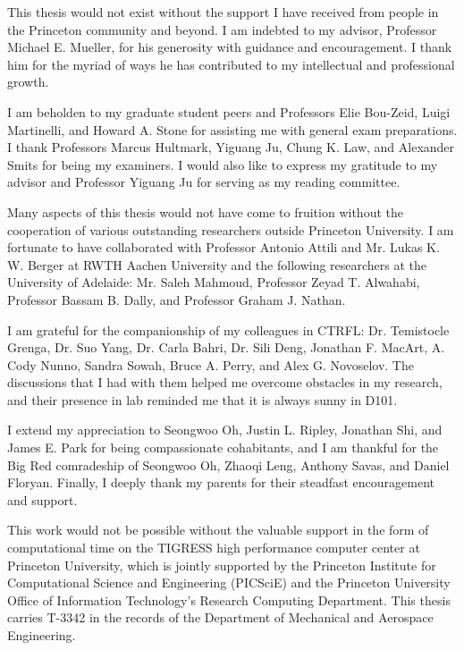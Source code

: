This thesis would not exist without the support I have received from people in the Princeton community and beyond. I am indebted to my advisor, Professor Michael E. Mueller, for his generosity with guidance and encouragement. I thank him for the myriad of ways he has contributed to my intellectual and professional growth.

I am beholden to my graduate student peers and Professors Elie Bou-Zeid, Luigi Martinelli, and Howard A. Stone for assisting me with general exam preparations. I thank Professors Marcus Hultmark, Yiguang Ju, Chung K. Law, and Alexander Smits for being my examiners. I would also like to express my gratitude to my advisor and Professor Yiguang Ju for serving as my reading committee.

Many aspects of this thesis would not have come to fruition without the cooperation of various outstanding researchers outside Princeton University. I am fortunate to have collaborated with Professor Antonio Attili and Mr. Lukas K. W. Berger at RWTH Aachen University and the following researchers at the University of Adelaide: Mr. Saleh Mahmoud, Professor Zeyad T. Alwahabi, Professor Bassam B. Dally, and Professor Graham J. Nathan.

I am grateful for the companionship of my colleagues in CTRFL: Dr. Temistocle Grenga, Dr. Suo Yang, Dr. Carla Bahri, Dr. Sili Deng, Jonathan F. MacArt, A. Cody Nunno, Sandra Sowah, Bruce A. Perry, and Alex G. Novoselov. The discussions that I had with them helped me overcome obstacles in my research, and their presence in lab reminded me that it is always sunny in D101.

I extend my appreciation to Seongwoo Oh, Justin L. Ripley, Jonathan Shi, and James E. Park for being compassionate cohabitants, and I am thankful for the Big Red comradeship of Seongwoo Oh, Zhaoqi Leng, Anthony Savas, and Daniel Floryan. Finally, I deeply thank my parents for their steadfast encouragement and support.

This work would not be possible without the valuable support in the form of computational time on the TIGRESS high performance computer center at Princeton University, which is jointly supported by the Princeton Institute for Computational Science and Engineering (PICSciE) and the Princeton University Office of Information Technology's Research Computing Department. This thesis carries T-3342 in the records of the Department of Mechanical and Aerospace Engineering.


